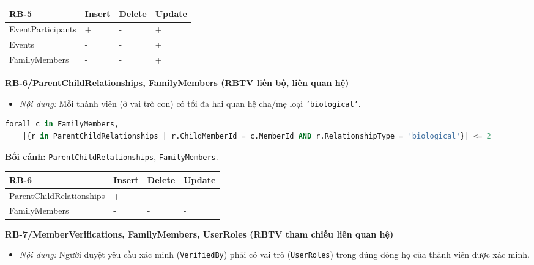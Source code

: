\vspace{0.4em}
{\centering
	\renewcommand{\arraystretch}{1.2}
	\begin{tabular}{|>{\raggedright\arraybackslash}p{}|>{\centering\arraybackslash}p{}|>{\centering\arraybackslash}p{}|>{\centering\arraybackslash}p{}|}
		\hline
		\textbf{RB-5} & \textbf{Insert} & \textbf{Delete} & \textbf{Update} \\ \hline
		EventParticipants & + & - & + \\ \hline
		Events & - & - & + \\ \hline
		FamilyMembers & - & - & + \\ \hline
	\end{tabular}\par}

\vspace{1.0em}
\textbf{RB-6/ParentChildRelationships, FamilyMembers (RBTV liên bộ, liên quan hệ)}
\begin{itemize}
	\item \emph{Nội dung:} Mỗi thành viên (ở vai trò con) có tối đa hai quan hệ cha/mẹ loại \texttt{'biological'}.
\end{itemize}

\begin{lstlisting}[language=SQL]
	forall c in FamilyMembers,
	|{r in ParentChildRelationships | r.ChildMemberId = c.MemberId AND r.RelationshipType = 'biological'}| <= 2
\end{lstlisting}
\noindent\textbf{Bối cảnh:} \texttt{ParentChildRelationships}, \texttt{FamilyMembers}.

\vspace{0.4em}
{\centering
	\renewcommand{\arraystretch}{1.2}
	\begin{tabular}{|>{\raggedright\arraybackslash}p{}|>{\centering\arraybackslash}p{}|>{\centering\arraybackslash}p{}|>{\centering\arraybackslash}p{}|}
		\hline
		\textbf{RB-6} & \textbf{Insert} & \textbf{Delete} & \textbf{Update} \\ \hline
		ParentChildRelationships & + & - & + \\ \hline
		FamilyMembers & - & - & - \\ \hline
	\end{tabular}\par}

\vspace{1.0em}
\textbf{RB-7/MemberVerifications, FamilyMembers, UserRoles (RBTV tham chiếu liên quan hệ)}
\begin{itemize}
	\item \emph{Nội dung:} Người duyệt yêu cầu xác minh (\texttt{VerifiedBy}) phải có vai trò (\texttt{UserRoles}) trong đúng dòng họ của thành viên được xác minh.
\end{itemize}

